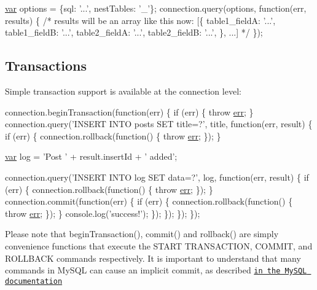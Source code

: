 \begin{DoxyCode}
\hyperlink{018__def_8c_a335628f2e9085305224b4f9cc6e95ed5}{var} options = \{sql: \textcolor{stringliteral}{'...'}, nestTables: \textcolor{charliteral}{'\_'}\};
connection.query(options, \textcolor{keyword}{function}(err, results) \{
  \textcolor{comment}{/* results will be an array like this now:}
\textcolor{comment}{  [\{}
\textcolor{comment}{    table1\_fieldA: '...',}
\textcolor{comment}{    table1\_fieldB: '...',}
\textcolor{comment}{    table2\_fieldA: '...',}
\textcolor{comment}{    table2\_fieldB: '...',}
\textcolor{comment}{  \}, ...]}
\textcolor{comment}{  */}
\});
\end{DoxyCode}


\subsection*{Transactions}

Simple transaction support is available at the connection level\+:


\begin{DoxyCode}
connection.beginTransaction(\textcolor{keyword}{function}(err) \{
  \textcolor{keywordflow}{if} (err) \{ \textcolor{keywordflow}{throw} \hyperlink{message_8cpp_aede5746344fdce99647541101eaa7f06}{err}; \}
  connection.query(\textcolor{stringliteral}{'INSERT INTO posts SET title=?'}, title, \textcolor{keyword}{function}(err, result) \{
    \textcolor{keywordflow}{if} (err) \{ 
      connection.rollback(\textcolor{keyword}{function}() \{
        \textcolor{keywordflow}{throw} \hyperlink{message_8cpp_aede5746344fdce99647541101eaa7f06}{err};
      \});
    \}

    \hyperlink{018__def_8c_a335628f2e9085305224b4f9cc6e95ed5}{var} log = \textcolor{stringliteral}{'Post '} + result.insertId + \textcolor{stringliteral}{' added'};

    connection.query(\textcolor{stringliteral}{'INSERT INTO log SET data=?'}, log, \textcolor{keyword}{function}(err, result) \{
      \textcolor{keywordflow}{if} (err) \{ 
        connection.rollback(\textcolor{keyword}{function}() \{
          \textcolor{keywordflow}{throw} \hyperlink{message_8cpp_aede5746344fdce99647541101eaa7f06}{err};
        \});
      \}  
      connection.commit(\textcolor{keyword}{function}(err) \{
        \textcolor{keywordflow}{if} (err) \{ 
          connection.rollback(\textcolor{keyword}{function}() \{
            \textcolor{keywordflow}{throw} \hyperlink{message_8cpp_aede5746344fdce99647541101eaa7f06}{err};
          \});
        \}
        console.log(\textcolor{stringliteral}{'success!'});
      \});
    \});
  \});
\});
\end{DoxyCode}
 Please note that begin\+Transaction(), commit() and rollback() are simply convenience functions that execute the S\+T\+A\+R\+T T\+R\+A\+N\+S\+A\+C\+T\+I\+O\+N, C\+O\+M\+M\+I\+T, and R\+O\+L\+L\+B\+A\+C\+K commands respectively. It is important to understand that many commands in My\+S\+Q\+L can cause an implicit commit, as described \href{http://dev.mysql.com/doc/refman/5.5/en/implicit-commit.html}{\tt in the My\+S\+Q\+L documentation}

